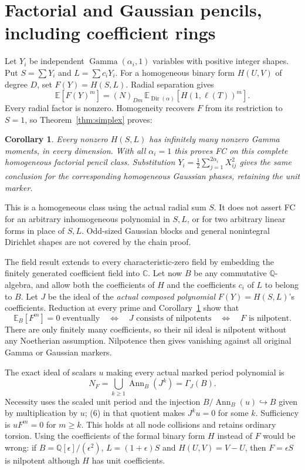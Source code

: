 \documentclass[11pt]{article}
\newtheorem{corollary}[theorem]{Corollary}
\newcommand{\C}{\mathbb C}
\newcommand{\Q}{\mathbb Q}
\DeclareMathOperator{\Ann}{Ann}
\begin{document}
\section{Factorial and Gaussian pencils, including coefficient rings}
Let $Y_i$ be independent $\operatorname{Gamma}(\alpha_i,1)$ variables with
positive integer shapes. Put $S=\sum Y_i$ and $L=\sum c_iY_i$.
For a homogeneous binary form $H(U,V)$ of degree $D$, set $F(Y)=H(S,L)$.
Radial separation gives
\[
 \mathbb E[F(Y)^m]=(N)_{Dm}\,
       \mathbb E_{\operatorname{Dir}(\alpha)}[H(1,\ell(T))^m].\tag{5}
\]
Every radial factor is nonzero. Homogeneity recovers $F$ from its restriction
to $S=1$, so Theorem~\ref{thm:simplex} proves:
\begin{corollary}\label{cor:pencil}
Every nonzero $H(S,L)$ has infinitely many nonzero Gamma moments, in every
dimension. With all $\alpha_i=1$ this proves FC on this complete homogeneous
factorial pencil class. Substitution
$Y_i=\frac12\sum_{j=1}^{2\alpha_i}X_{ij}^2$ gives the same conclusion for
the corresponding homogeneous Gaussian phases, retaining the unit marker.
\end{corollary}
This is a homogeneous class using the actual radial sum $S$. It does not
assert FC for an arbitrary inhomogeneous polynomial in $S,L$, or for two
arbitrary linear forms in place of $S,L$. Odd-sized Gaussian blocks and
general nonintegral Dirichlet shapes are not covered by the chain proof.

The field result extends to every characteristic-zero field by embedding
the finitely generated coefficient field into $\C$. Let now $B$ be any
commutative $\Q$-algebra, and allow both the coefficients of $H$ and the
coefficients $c_i$ of $L$ to belong to $B$. Let $J$ be the ideal of the
\emph{actual composed polynomial} $F(Y)=H(S,L)$'s coefficients.
Reduction at every prime and Corollary~\ref{cor:pencil} show that
\[
 \mathbb E_B[F^m]=0\text{ eventually}
 \quad\Longleftrightarrow\quad J\text{ consists of nilpotents}
 \quad\Longleftrightarrow\quad F\text{ is nilpotent}.        \tag{6}
\]
There are only finitely many coefficients, so their nil ideal is nilpotent
without any Noetherian assumption. Nilpotence then gives vanishing against
all original Gamma or Gaussian markers.

The exact ideal of scalars $u$ making every actual marked period polynomial
is
\[
 N_F=\bigcup_{k\ge1}\Ann_B(J^k)=\Gamma_J(B).                \tag{7}
\]
Necessity uses the scaled unit period and the injection
$B/\Ann_B(u)\hookrightarrow B$ given by multiplication by $u$; (6) in
that quotient makes $J^ku=0$ for some $k$. Sufficiency is $uF^m=0$ for
$m\ge k$. This holds at all node collisions and retains ordinary torsion.
Using the coefficients of the formal binary form $H$ instead of $F$ would
be wrong: if $B=\Q[\epsilon]/(\epsilon^2)$, $L=(1+\epsilon)S$ and
$H(U,V)=V-U$, then $F=\epsilon S$ is nilpotent although $H$ has unit
coefficients.
\end{document}
